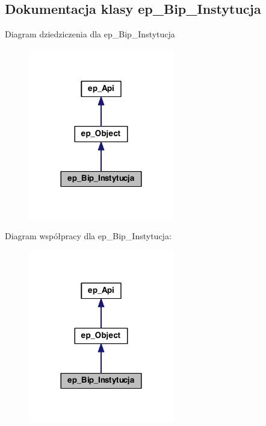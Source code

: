 \hypertarget{classep___bip___instytucja}{\subsection{Dokumentacja klasy ep\-\_\-\-Bip\-\_\-\-Instytucja}
\label{classep___bip___instytucja}
}


Diagram dziedziczenia dla ep\-\_\-\-Bip\-\_\-\-Instytucja\nopagebreak
\begin{figure}[H]
\begin{center}
\leavevmode
\includegraphics[width=180pt]{classep___bip___instytucja__inherit__graph}
\end{center}
\end{figure}


Diagram współpracy dla ep\-\_\-\-Bip\-\_\-\-Instytucja\-:\nopagebreak
\begin{figure}[H]
\begin{center}
\leavevmode
\includegraphics[width=180pt]{classep___bip___instytucja__coll__graph}
\end{center}
\end{figure}
